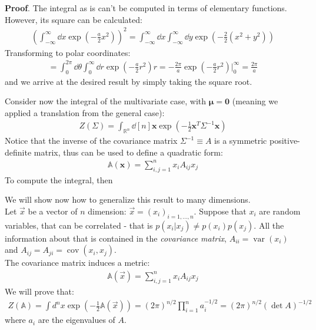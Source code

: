 \documentclass[../template.tex]{subfiles}
\begin{document}
\begin{expl}
    \textbf{Proof}. The integral as is can't be computed in terms of elementary functions. However, its square can be calculated:
    \begin{align*}
        \left(\int_{-\infty}^{\infty}\dd{x}  \exp\left(-\frac{a}{2}x^2 \right)\right)^2 =
        \int_{-\infty}^{\infty} \dd{x} \int_{-\infty}^{\infty} \dd{y} \exp \left(-\frac{2}{2} (x^2 + y^2) \right)
    \end{align*} 
    Transforming to polar coordinates:
    \begin{align*}
        = \int_0^{2\pi} \dd{\theta} \int_{0}^{\infty} \dd{r} \exp\left(-\frac{a}{2}r^2 \right) r = -\frac{2 \pi}{a} \exp\left(-\frac{a}{2}r^2 \right) \Big|_{0}^{\infty} = \frac{2 \pi}{a}  
    \end{align*}
    and we arrive at the desired result by simply taking the square root.
\end{expl}

Consider now the integral of the multivariate case, with $\bm{\mu} = \bm{0}$ (meaning we applied a translation from the general case): 
\begin{align*}
    Z(\Sigma) = \int_{\mathbb{R}^n} \dd[n]{\bm{x}}\exp\left(-\frac{1}{2}\bm{x}^T \Sigma^{-1} \bm{x} \right)
\end{align*}
Notice that the inverse of the covariance matrix $\Sigma^{-1} \equiv A$ is a symmetric positive-definite matrix, thus can be used to define a quadratic form:
\begin{align*}
    \mathbb{A}(\bm{x}) = \sum_{i,j=1}^n x_i A_{ij} x_j
\end{align*} 
To compute the integral, then 


We will show now how to generalize this result to many dimensions.\\
Let $\vec{x}$ be a vector of $n$ dimension: $\vec{x} = (x_i)_{i=1,\dots, n}$. Suppose that $x_i$ are random variables, that can be correlated - that is $p(x_i | x_j) \neq p(x_i) p(x_j)$. All the information about that is contained in the \textit{covariance matrix}, $A_{i i} = \operatorname{var} (x_i)$ and $A_{ij} = A_{ji} = \operatorname{cov}(x_i, x_j)$. \\
The covariance matrix induces a metric:
\begin{align*}
    \mathbb{A}(\vec{x}) = \sum_{i,j=1}^{n} x_i A_{ij} x_j
\end{align*}
We will prove that:
\begin{align*}
    Z(\mathbb{A}) = \int d^n x \exp\left(-\frac{1}{2} \mathbb{A}(\vec{x}) \right) = (2\pi)^{n/2} \prod_{i=1}^n a_i^{-1/2} = (2\pi)^{n/2} (\operatorname{det} A)^{-1/2}
\end{align*}
where $a_i$ are the eigenvalues of $A$.\\
\end{document}
